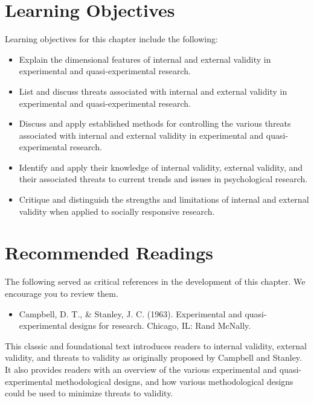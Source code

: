 \documentclass[
  11pt,
]{book}
\providecommand{\tightlist}{%
  \setlength{\itemsep}{0pt}\setlength{\parskip}{0pt}}
\begin{document}
\hypertarget{learning-objectives}{%
\section{Learning Objectives}\label{learning-objectives}}

Learning objectives for this chapter include the following:

\begin{itemize}
\tightlist
\item
  Explain the dimensional features of internal and external validity in experimental and quasi-experimental research.
\item
  List and discuss threats associated with internal and external validity in experimental and quasi-experimental research.
\item
  Discuss and apply established methods for controlling the various threats associated with internal and external validity in experimental and quasi-experimental research.
\item
  Identify and apply their knowledge of internal validity, external validity, and their associated threats to current trends and issues in psychological research.
\item
  Critique and distinguish the strengths and limitations of internal and external validity when applied to socially responsive research.
\end{itemize}

\hypertarget{recommended-readings}{%
\section{Recommended Readings}\label{recommended-readings}}

The following served as critical references in the development of this chapter. We encourage you to review them.

\begin{itemize}
\tightlist
\item
  Campbell, D. T., \& Stanley, J. C. (1963). Experimental and quasi- experimental designs for research. Chicago, IL: Rand McNally.
\end{itemize}

This classic and foundational text introduces readers to internal validity, external validity, and threats to validity as originally proposed by Campbell and Stanley. It also provides readers with an overview of the various experimental and quasi-experimental methodological designs, and how various methodological designs could be used to minimize threats to validity.
\end{document}
